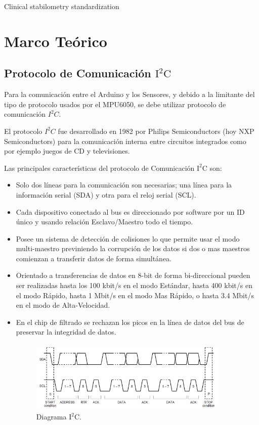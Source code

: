 \documentclass[12pt,a4paper]{article}
\begin{document}
			Clinical stabilometry standardization\cite{scoppa_clinical_2013}
			
			
			
			\section{Marco Te\'orico}
			
			\subsection{Protocolo de Comunicación $\mathbf{\mathrm{I^2C}}$}
			Para la comunicación entre el Arduino y los Sensores, y debido a la limitante del tipo de protocolo usados por el MPU6050, se debe utilizar protocolo de comunicación $I^2C$.
			
			El protocolo $I^2C$ fue desarrollado en 1982 por Philips Semiconductors (hoy NXP Semiconductors) para la comunicación interna entre circuitos integrados como por ejemplo juegos de CD y televisiones.
			
			Las principales características del protocolo de Comunicación $\mathrm{I^2C}$ \cite{I2C} son:
			\begin{itemize}
				\item Solo dos líneas para la comunicación son necesarias; una línea para la información serial (SDA) y otra para el reloj serial (SCL).
				
				\item Cada dispositivo conectado al bus es direccionado por software por un ID único y usando relación Esclavo/Maestro todo el tiempo.
				
				\item Posee un sistema de detección de colisiones lo que permite usar el modo multi-maestro previniendo la corrupción de los datos si dos o mas maestros comienzan a transferir datos de forma simultánea.
				
				\item Orientado a transferencias de datos en 8-bit de forma bi-direccional pueden ser realizadas hasta los 100 kbit/s en el modo Estándar, hasta 400 kbit/s en el modo Rápido, hasta 1 Mbit/s en el modo Mas Rápido, o hasta 3.4 Mbit/s en el modo de Alta-Velocidad.
				
				\item En el chip de filtrado se rechazan los picos en la línea de datos del bus de preservar la integridad de datos.
				
				\begin{figure}[H]
					\centering
					\includegraphics[width=0.9\textwidth]{images/Diagrama_I2C}
					\caption{Diagrama $\mathrm{I^2C.}$}
					\label{fig:diagramaI2C}
				\end{figure}
			\end{itemize}
			
\end{document}
